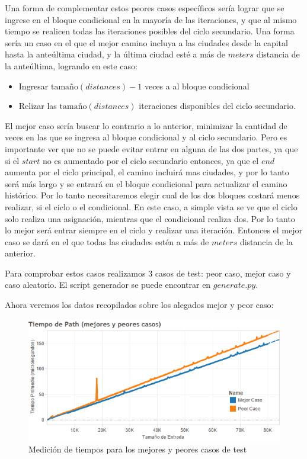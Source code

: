 \documentclass{article}
\theoremstyle{definition}
\theoremstyle{remark}
\begin{document}
Una forma de complementar estos peores casos específicos sería lograr que se ingrese en el bloque condicional en la mayoría de las iteraciones, y que al mismo tiempo se realicen todas las iteraciones posibles del ciclo secundario. Una forma sería un caso en el que el mejor camino incluya a las ciudades desde la capital hasta la anteúltima ciudad, y la última ciudad esté a más de $meters$ distancia de la anteúltima, logrando en este caso:
\begin{itemize}
\item Ingresar $\text{tamaño}(distances)-1$ veces a al bloque condicional
\item Relizar las $\text{tamaño}(distances)$ iteraciones disponibles del ciclo secundario.
\end{itemize}
\newline
El mejor caso sería buscar lo contrario a lo anterior, minimizar la cantidad de veces en las que se ingresa al bloque condicional y al ciclo secundario. Pero es importante ver que no se puede evitar entrar en alguna de las dos partes, ya que si el $start$ no es aumentado por el ciclo secundario entonces, ya que el $end$ aumenta por el ciclo principal, el camino incluirá mas ciudades, y por lo tanto será más largo y se entrará en el bloque condicional para actualizar el camino histórico. Por lo tanto necesitaremos elegir cual de los dos bloques costará menos realizar, si el ciclo o el condicional. En este caso, a simple vista se ve que el ciclo solo realiza una asignación, mientras que el condicional realiza dos. Por lo tanto lo mejor será entrar siempre en el ciclo y realizar una iteración. Entonces el mejor caso se dará en el que todas las ciudades estén a más de $meters$ distancia de la anterior.

Para comprobar estos casos realizamos 3 casos de test: peor caso, mejor caso y caso aleatorio. El script generador se puede encontrar en $generate.py$.

Ahora veremos los datos recopilados sobre los alegados mejor y peor caso:

\begin{figure}[h!]
\centering
\includegraphics[width=15cm]{docs/images/ex1-best-worst.png}
\caption{Medición de tiempos para los mejores y peores casos de test}
\label{exp1plot}
\end{figure}
\end{document}
